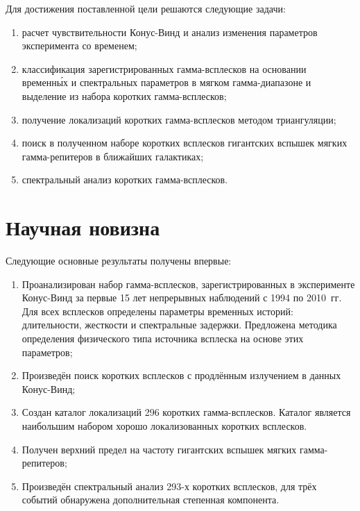 Для достижения поставленной цели решаются следующие задачи:
\begin{enumerate}
\item расчет чувствительности Конус-Винд и анализ изменения параметров эксперимента со временем;
\item классификация зарегистрированных гамма-всплесков на основании временн\'{ы}х 
и спектральных параметров в мягком гамма-диапазоне и выделение из набора коротких гамма-всплесков; 
\item получение локализаций коротких гамма-всплесков методом триангуляции; 
\item поиск в полученном наборе коротких всплесков гигантских 
вспышек мягких гамма-репитеров в ближайших галактиках;
\item спектральный анализ коротких гамма-всплесков.
\end{enumerate}

\section*{Научная новизна}

Следующие основные результаты получены впервые:
\begin{enumerate}
\item Проанализирован набор гамма-всплесков, зарегистрированных в эксперименте 
Конус-Винд за первые 15 лет непрерывных наблюдений с 1994 по 2010~гг. Для всех 
всплесков определены параметры временных историй: длительности, жесткости и спектральные задержки.
Предложена методика определения физического типа источника всплеска на основе этих параметров;
\item Произведён поиск коротких всплесков с продлённым излучением в данных Конус-Винд;
\item Создан каталог локализаций 296 коротких гамма-всплесков. Каталог является 
наибольшим набором хорошо локализованных коротких всплесков. 
\item Получен верхний предел на частоту гигантских вспышек мягких гамма-репитеров;
\item Произведён спектральный анализ 293-х коротких всплесков, для трёх событий обнаружена
дополнительная степенная компонента.

\end{enumerate}


